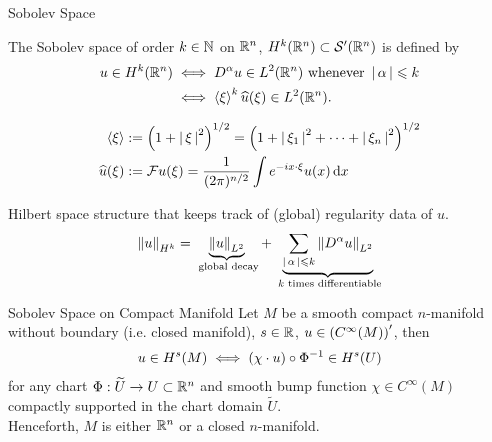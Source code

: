 \documentclass{beamer}
\begin{document}
\begin{frame}{Sobolev Space}
\begin{definition}
    The Sobolev space of order $k \in \N$ on $\R^n$,  $H^k(\R^n) \subset \sch'(\R^n)$  is defined by 
    \begin{align*}
    u \in H^k(\R^n) 
    &\iff D^\alpha u \in L^2(\R^n) \text{ whenever } \abs{\alpha} \leq k\\
    &\iff \sym[\xi]^k \widehat{u}(\xi) \in L^2(\R^n). 
    \end{align*}
\end{definition}

\begin{align*}
\sym[\xi] &:= \brac{1 + \abs{\xi}^2}^{1/2} = \brac{1 + \abs{\xi_1}^2+ \dots + \abs{\xi_n}^2}^{1/2} \\
\widehat{u}(\xi) &:= \F u(\xi)  = \frac{1}{(2\pi)^{n/2}} \int e^{-ix \cdot \xi} u(x)\d[x] 
\end{align*}

Hilbert space structure that keeps track of (global) regularity data of $u$. 
\begin{align*}
    \norm[u]_{H^k} = \underbrace{\norm[u]_{L^2}}_{\text{ global decay}}  + \underbrace{\sum_{\abs{\alpha} \leq k} \norm[D^\alpha u ]_{L^2} }_{\text{ $k$ times differentiable}} 
\end{align*}

\end{frame} 


\begin{frame}{Sobolev Space on Compact Manifold}
Let $M$ be a smooth compact $n$-manifold without boundary (i.e. closed manifold), $s \in \R$, $u \in \brac{C^\infty(M)}'$, then 
\begin{align*}
u \in H^s(M) \iff \brac{\chi \cdot  u} \circ \Phi^{-1} \in H^s(U)
\end{align*} 
for any chart $\Phi : \widetilde{U} \to U \subset \R^n$ and smooth bump function $\chi \in C^\infty(M)$ compactly supported in the chart domain $\widetilde{U}$. \\[3em]
\pause 
Henceforth, $M$ is either $\R^n$ or a closed $n$-manifold. 
\end{frame} 
\end{document}
